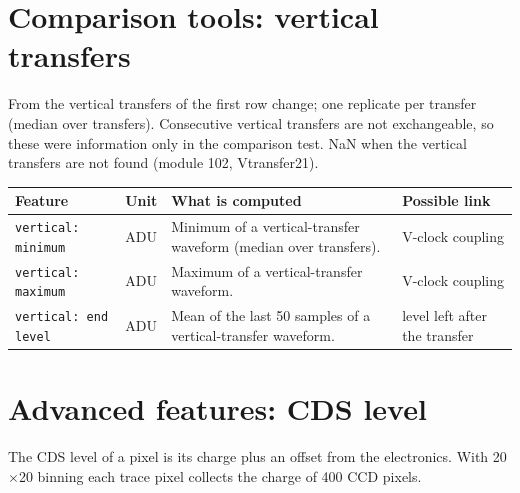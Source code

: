 \documentclass[10pt]{article}
\begin{document}
\section{Comparison tools: vertical transfers}
From the vertical transfers of the first row change; one replicate per transfer (median over transfers). Consecutive vertical transfers are not exchangeable, so these were information only in the comparison test. NaN when the vertical transfers are not found (module 102, Vtransfer21).

\begin{longtable}{>{\raggedright\arraybackslash}p{}>{\raggedright\arraybackslash}p{}>{\raggedright\arraybackslash}p{}>{\raggedright\arraybackslash}p{}}
\toprule Feature & Unit & What is computed & Possible link \\ \midrule \endhead
\bottomrule \endfoot
\texttt{vertical: minimum} & ADU & Minimum of a vertical-transfer waveform (median over transfers). & V-clock coupling \\
\texttt{vertical: maximum} & ADU & Maximum of a vertical-transfer waveform. & V-clock coupling \\
\texttt{vertical: end level} & ADU & Mean of the last 50 samples of a vertical-transfer waveform. & level left after the transfer \\
\end{longtable}

\section{Advanced features: CDS level}
The CDS level of a pixel is its charge plus an offset from the electronics. With 20$\times$20 binning each trace pixel collects the charge of 400 CCD pixels.
\end{document}
